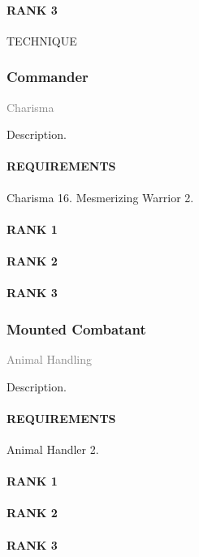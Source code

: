 \paragraph{RANK 3} TECHNIQUE

\subsubsection{Commander} \label{feat::commander}
\small{\textcolor{gray}{Charisma}}

\normalsize
Description.
\paragraph{REQUIREMENTS} Charisma 16. Mesmerizing Warrior 2.
\paragraph{RANK 1}
\paragraph{RANK 2}
\paragraph{RANK 3} %

\subsubsection{Mounted Combatant} \label{feat::mountedcombatant} %
\small{\textcolor{gray}{Animal Handling}}

\normalsize
Description.
\paragraph{REQUIREMENTS} Animal Handler 2.
\paragraph{RANK 1}
\paragraph{RANK 2}
\paragraph{RANK 3}

